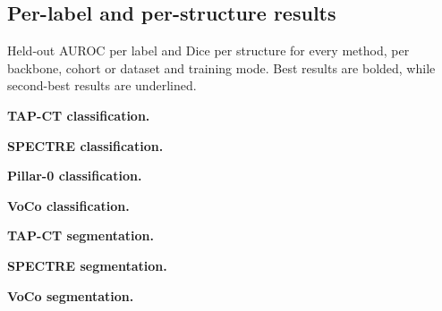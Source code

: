 \subsection{Per-label and per-structure results}
\label{app:perlabeltables}
Held-out AUROC per label and Dice per structure for every method, per backbone, cohort or dataset and training mode. Best results are bolded, while second-best results are underlined.

\clearpage
\noindent\textbf{TAP-CT classification.}\par\medskip

\clearpage
\noindent\textbf{SPECTRE classification.}\par\medskip

\clearpage
\noindent\textbf{Pillar-0 classification.}\par\medskip


\medskip\noindent\textbf{VoCo classification.}\par\medskip

\clearpage
\noindent\textbf{TAP-CT segmentation.}\par\medskip

\clearpage
\noindent\textbf{SPECTRE segmentation.}\par\medskip

\clearpage
\noindent\textbf{VoCo segmentation.}\par\medskip

